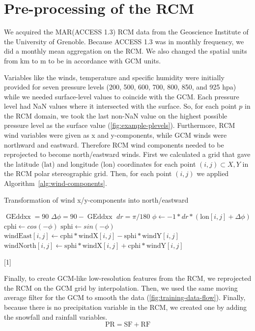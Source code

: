 \documentclass[a4paper,11pt,oneside]{report}
\begin{document}
\section{Pre-processing of the RCM}\label{sec:preproc-RCM}
We acquired the MAR(ACCESS 1.3) RCM data from the Geoscience Institute of the University of Grenoble. Because ACCESS 1.3 was in monthly frequency, we did a monthly mean aggregation on the RCM. We also changed the spatial units from \si{km} to \si{m} to be in accordance with GCM units. 

Variables like the winds, temperature and specific humidity were initially provided for seven pressure levels (200, 500, 600, 700, 800, 850, and 925 \si{hpa}) while we needed surface-level values to coincide with the GCM. Each pressure level had NaN values where it intersected with the surface. So, for each point $p$ in the RCM domain, we took the last non-NaN value on the highest possible pressure level as the surface value (\autoref{fig:example-plevels}). Furthermore, RCM wind variables were given as x and y-components, while GCM winds were northward and eastward. Therefore RCM wind components needed to be reprojected to become north/eastward winds. First we calculated a grid that gave the latitude ($\mathrm{lat}$) and longitude ($\mathrm{lon}$) coordinates for each point $(i,j)\subset X,Y $ in the RCM polar stereographic grid. Then, for each point $(i,j)$ we applied Algorithm~\ref{alg:wind-components}.
    \begin{algorithm}
    \caption{Transformation of wind x/y-components into north/eastward}\label{alg:wind-components}
    \begin{algorithmic}[1]
    \State $\operatorname{GEddxx} = 90$
    \State $\Delta \phi = 90 - \operatorname{GEddxx}$
    \State $dr = \pi / 180$ 
    \State $\phi \gets -1*dr*(\mathrm{lon}[i,j] + \Delta \phi)$
    \State $\mathrm{cphi} \gets cos(-\phi)$
    \State $\mathrm{sphi} \gets sin(-\phi)$
    \State  $\mathrm{windEast}[i, j] \gets \mathrm{cphi} * \mathrm{windX}[i, j] - \mathrm{sphi} * \mathrm{windY}[i,j]$ 
    \State $\mathrm{windNorth}[i, j] \gets  \mathrm{sphi} * \mathrm{windX}[i, j] + \mathrm{cphi} * \mathrm{windY}[i, j]$ 
    \EndFor
    \end{algorithmic}[1]
    \end{algorithm}
Finally, to create GCM-like low-resolution features from the RCM, we reprojected the RCM on the GCM grid by interpolation. Then, we used the same moving average filter for the GCM to smooth the data (\autoref{fig:training-data-flow}). Finally, because there is no precipitation variable in the RCM, we created one by adding the snowfall and rainfall variables. 
    \begin{equation*}
        \mathrm{PR} = \mathrm{SF} + \mathrm{RF}
    \end{equation*}
\end{document}
